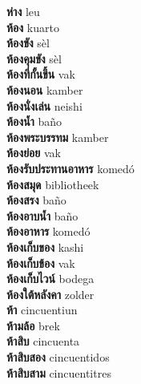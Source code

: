 \textbf{ ห่าง  } leu \\
\textbf{ ห้อง  } kuarto \\
\textbf{ ห้องขัง  } sèl \\
\textbf{ ห้องคุมขัง  } sèl \\
\textbf{ ห้องที่กั้นขึ้น  } vak \\
\textbf{ ห้องนอน  } kamber \\
\textbf{ ห้องนั่งเล่น  } neishi \\
\textbf{ ห้องน้ำ  } baño \\
\textbf{ ห้องพระบรรทม  } kamber \\
\textbf{ ห้องย่อย  } vak \\
\textbf{ ห้องรับประทานอาหาร  } komedó \\
\textbf{ ห้องสมุด  } bibliotheek \\
\textbf{ ห้องสรง  } baño \\
\textbf{ ห้องอาบน้ำ  } baño \\
\textbf{ ห้องอาหาร  } komedó \\
\textbf{ ห้องเก็บของ  } kashi \\
\textbf{ ห้องเก็บข้อง  } vak \\
\textbf{ ห้องเก็บไวน์  } bodega \\
\textbf{ ห้องใต้หลังคา  } zolder \\
\textbf{ ห้า  } cincuentiun \\
\textbf{ ห้ามล้อ  } brek \\
\textbf{ ห้าสิบ  } cincuenta \\
\textbf{ ห้าสิบสอง  } cincuentidos \\
\textbf{ ห้าสิบสาม  } cincuentitres \\
